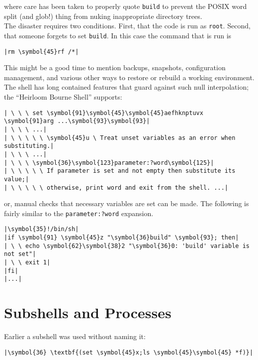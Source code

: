 \documentclass[10pt,a4paper]{article}
\begin{document}
where care has been taken to properly quote \texttt{build} to
prevent the POSIX word split (and glob!) thing from nuking inappropriate
directory trees. \\

The disaster requires two conditions. First, that the code is run as
\texttt{root}. Second, that someone forgets to set
\texttt{build}. In this case the command that is run is

\begin{lstlisting}
|rm \symbol{45}rf /*|
\end{lstlisting}

This might be a good time to mention backups, snapshots, configuration
management, and various other ways to restore or rebuild a working
environment. The shell has long contained features that guard against
such null interpolation; the ``Heirloom Bourne Shell'' supports:

\begin{lstlisting}
| \ \ \ set \symbol{91}\symbol{45}\symbol{45}aefhknptuvx \symbol{91}arg ...\symbol{93}\symbol{93}|
| \ \ \ ...|
| \ \ \ \ \ \symbol{45}u \ Treat unset variables as an error when substituting.|
| \ \ \ ...|
| \ \ \ \symbol{36}\symbol{123}parameter:?word\symbol{125}|
| \ \ \ \ \ If parameter is set and not empty then substitute its value;|
| \ \ \ \ \ otherwise, print word and exit from the shell. ...|
\end{lstlisting}

or, manual checks that necessary variables are set can be made. The
following is fairly similar to the
\texttt{parameter:?word} expansion.

\begin{lstlisting}
|\symbol{35}!/bin/sh|
|if \symbol{91} \symbol{45}z "\symbol{36}build" \symbol{93}; then|
| \ \ echo \symbol{62}\symbol{38}2 "\symbol{36}0: 'build' variable is not set"|
| \ \ exit 1|
|fi|
|...|
\end{lstlisting}

\section*{Subshells and Processes}

Earlier a subshell was used without naming it:

\begin{lstlisting}
|\symbol{36} \textbf{(set \symbol{45}x;ls \symbol{45}\symbol{45} *f)}|
\end{lstlisting}
\end{document}
